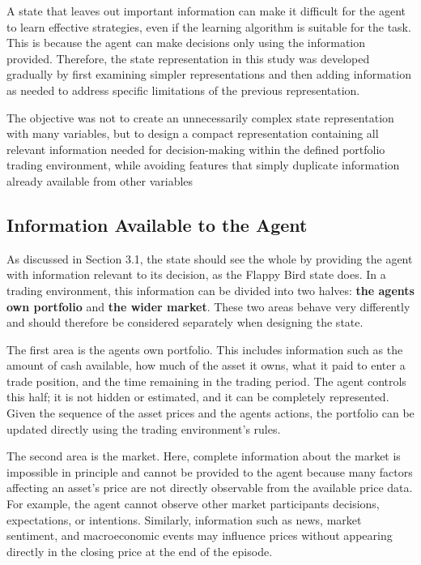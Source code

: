 A state that leaves out important information can make it difficult for
the agent to learn effective strategies, even if the learning algorithm
is suitable for the task. This is because the agent can make decisions
only using the information provided. Therefore, the state representation
in this study was developed gradually by first examining simpler
representations and then adding information as needed to address
specific limitations of the previous representation.

The objective was not to create an unnecessarily complex state
representation with many variables, but to design a compact
representation containing all relevant information needed for
decision-making within the defined portfolio trading environment, while
avoiding features that simply duplicate information already available
from other variables

\subsection{Information Available to the Agent}

As discussed in Section 3.1, the state should see the whole by providing
the agent with information relevant to its decision, as the Flappy Bird
state does. In a trading environment, this information can be divided
into two halves: \textbf{the agent\textquotesingle s own portfolio} and
\textbf{the wider market}. These two areas behave very differently and
should therefore be considered separately when designing the state.

The first area is the agent\textquotesingle s own portfolio. This
includes information such as the amount of cash available, how much of
the asset it owns, what it paid to enter a trade position, and the time
remaining in the trading period. The agent controls this half; it is not
hidden or estimated, and it can be completely represented. Given the
sequence of the asset prices and the agent\textquotesingle s actions,
the portfolio can be updated directly using the trading environment's
rules.

The second area is the market. Here, complete information about the
market is impossible in principle and cannot be provided to the agent
because many factors affecting an asset's price are not directly
observable from the available price data. For example, the agent cannot
observe other market participants\textquotesingle{} decisions,
expectations, or intentions. Similarly, information such as news, market
sentiment, and macroeconomic events may influence prices without
appearing directly in the closing price at the end of the episode.

